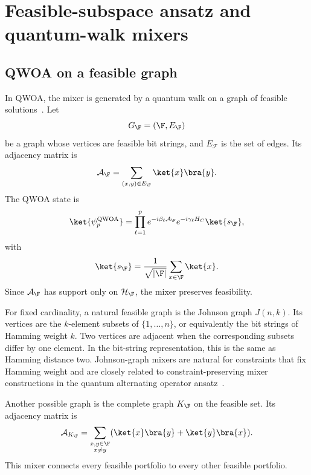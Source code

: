 \section{\label{sec:dicke-grover}Feasible-subspace ansatz and quantum-walk mixers}

\subsection{\label{subsec:qwoa}QWOA on a feasible graph}

In QWOA, the mixer is generated by a quantum walk on a graph of feasible
solutions~\cite{Marsh2019,Marsh2020}. Let
\begin{equation}
    G_{\F}=(\F,E_{\F})
\end{equation}
be a graph whose vertices are feasible bit strings, and $E_{\mathcal{F}}$ is the set of edges. Its adjacency matrix is
\begin{equation}
    \mathcal{A}_{\F}
    =
    \sum_{(x,y)\in E_{\F}}
    \ket{x}\bra{y}.
    \label{eq:feasible-adjacency}
\end{equation}
The QWOA state is
\begin{equation}
    \ket{\psi_p^{\mathrm{QWOA}}}
    =
    \prod_{\ell=1}^{p}
    e^{-i\beta_\ell \mathcal{A}_{\F}}
    e^{-i\gamma_\ell H_C}
    \ket{s_{\F}},
    \label{eq:qwoa-state}
\end{equation}
with
\begin{equation}
    \ket{s_{\F}}
    =
    \frac{1}{\sqrt{|\F|}}
    \sum_{x\in\F}\ket{x}.
    \label{eq:uniform-feasible-state}
\end{equation}
Since $\mathcal{A}_{\F}$ has support only on $\mathcal{H}_{\F}$, the mixer preserves
feasibility.

For fixed cardinality, a natural feasible graph is the Johnson graph
$J(n,k)$. Its vertices are the $k$-element subsets of $\{1,\ldots,n\}$, or
equivalently the bit strings of Hamming weight $k$. Two vertices are adjacent
when the corresponding subsets differ by one element. In the bit-string
representation, this is the same as Hamming distance two. Johnson-graph mixers are natural for
constraints that fix Hamming weight and are closely related to constraint-preserving mixer
constructions in the quantum alternating operator ansatz~\cite{Cook2019}.

Another possible graph is the complete graph $K_{\F}$ on the feasible set. Its
adjacency matrix is
\begin{equation}
    \mathcal{A}_{K_{\F}}
    =
    \sum_{\substack{x,y\in\F\\x\neq y}}
    (\ket{x}\bra{y} + \ket{y}\bra{x}).
    \label{eq:complete-adjacency}
\end{equation}
This mixer connects every feasible portfolio to every other feasible
portfolio.

